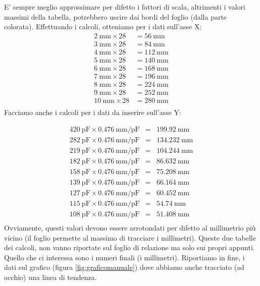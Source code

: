\documentclass[12pt,a4paper,oneside]{book}
\theoremstyle{esercizio}
\begin{document}
E' sempre meglio approssimare per difetto i fattori di scala, altrimenti i valori massimi della tabella, potrebbero uscire dai bordi del foglio (dalla parte colorata).
Effettuando i calcoli, otteniamo per i dati sull'asse X:
\begin{equation*}
\begin{aligned}
\SI{2}{\milli\meter} \times 28 &= \SI{56}{\milli\meter}  \\
\SI{3}{\milli\meter}  \times 28 &= \SI{84}{\milli\meter}  \\
\SI{4}{\milli\meter}  \times 28 &= \SI{112}{\milli\meter}   \\
\SI{5}{\milli\meter}  \times 28 &= \SI{140}{\milli\meter}  \\
\SI{6}{\milli\meter}  \times 28 &= \SI{168}{\milli\meter}   \\
\SI{7}{\milli\meter}  \times 28 &= \SI{196}{\milli\meter}  \\
\SI{8}{\milli\meter}  \times 28 &= \SI{224}{\milli\meter}  \\
\SI{9}{\milli\meter}  \times 28 &= \SI{252}{\milli\meter}  \\
\SI{10}{\milli\meter}  \times 28 &= \SI{280}{\milli\meter}  \\
\end{aligned}
\end{equation*}
Facciamo anche i calcoli per i dati da inserire sull'asse Y:

\[
\begin{array}{rcl}
\SI{420}{\pico\farad} \times \SI{0.476}{\milli\meter\per\pico\farad} &=& \SI{199.92}{\milli\meter} \\
\SI{282}{\pico\farad} \times \SI{0.476}{\milli\meter\per\pico\farad} &=& \SI{134.232}{\milli\meter} \\
\SI{219}{\pico\farad} \times \SI{0.476}{\milli\meter\per\pico\farad} &=& \SI{104.244}{\milli\meter} \\
\SI{182}{\pico\farad} \times \SI{0.476}{\milli\meter\per\pico\farad} &=& \SI{86.632}{\milli\meter} \\
\SI{158}{\pico\farad} \times \SI{0.476}{\milli\meter\per\pico\farad} &=& \SI{75.208}{\milli\meter} \\
\SI{139}{\pico\farad} \times \SI{0.476}{\milli\meter\per\pico\farad} &=& \SI{66.164}{\milli\meter} \\
\SI{127}{\pico\farad} \times \SI{0.476}{\milli\meter\per\pico\farad} &=& \SI{60.452}{\milli\meter} \\
\SI{115}{\pico\farad} \times \SI{0.476}{\milli\meter\per\pico\farad} &=& \SI{54.74}{\milli\meter} \\
\SI{108}{\pico\farad} \times \SI{0.476}{\milli\meter\per\pico\farad} &=& \SI{51.408}{\milli\meter} \\
\end{array}
\]
Ovviamente, questi valori devono essere arrotondati per difetto al millimetrio più vicino (il foglio permette al massimo di tracciare i millimetri). Queste due tabelle dei calcoli, non vanno riportate sul foglio di relazione ma solo sui propri appunti. Quello che ci interessa sono i numeri finali (i millimetri). Riportiamo in fine, i dati sul grafico (figura \ref{fig:graficomanuale}) dove abbiamo anche tracciato (ad occhio) una linea di tendenza. 
 
\end{document}
